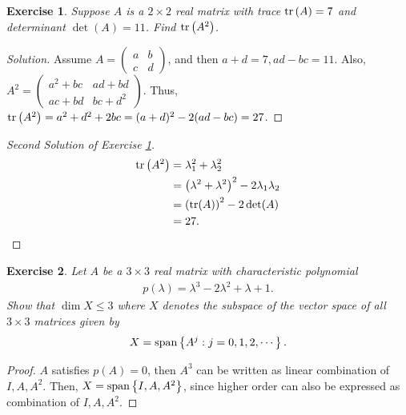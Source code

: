 \documentclass[11pt]{book}
\newtheorem{exercise}{Exercise}[section]
\theoremstyle{definition}
\numberwithin{equation}{chapter}
\begin{document}
\begin{exercise}\label{exer_trace}
Suppose $A$ is a $2 \times 2$ real matrix with trace ${\rm tr}\left(A \right) = 7$ and determinant $\det (A) = 11$. Find ${\rm tr}\left(A^2 \right)$.
\end{exercise}
\begin{proof}[Solution]
Assume $A = \begin{pmatrix} a & b \\ c & d \end{pmatrix}$, and then $a + d = 7, ad - bc = 11$. Also, $A^2 = \begin{pmatrix} a^2+bc &ad+bd \\ ac+bd & bc+d^2 \end{pmatrix}$. Thus, ${\rm tr}\left(A^2 \right) = a^2 + d^2 + 2bc = (a+d)^2 - 2(ad-bc) = 27$.
\end{proof}

\medskip

\begin{proof}[Second Solution of Exercise \ref{exer_trace}]
\begin{align*}
    {\rm tr}\left(A^2 \right) & = \lambda_1^2 + \lambda_2^2 \\
    & = \left(\lambda^2 + \lambda^2\right)^2 - 2 \lambda_1 \lambda_2 \\
    & = \left( {\rm tr}(A)\right)^2 - 2 \det (A) \\
    & = 27.
\end{align*}
\end{proof}

\medskip

\begin{exercise}
Let $A$ be a $3 \times 3$ real matrix with characteristic polynomial
\begin{align*}
    p(\lambda) = \lambda^3 - 2 \lambda^2 + \lambda + 1.
\end{align*}
Show that $\dim X \leq 3$ where $X$ denotes the subspace of the vector space of all $3 \times 3$ matrices given by 
\begin{align*}
    X = {\rm span} \left\{A^j: j = 0,1,2,\cdots\right\}.
\end{align*}
\end{exercise}
\begin{proof}
$A$ satisfies $p(A) = 0$, then $A^3$ can be written as linear combination of $I, A, A^2$. Then, $X = {\rm span} \left\{I, A, A^2\right\}$, since higher order can also be expressed as combination of $I, A, A^2$.
\end{proof}
\end{document}
